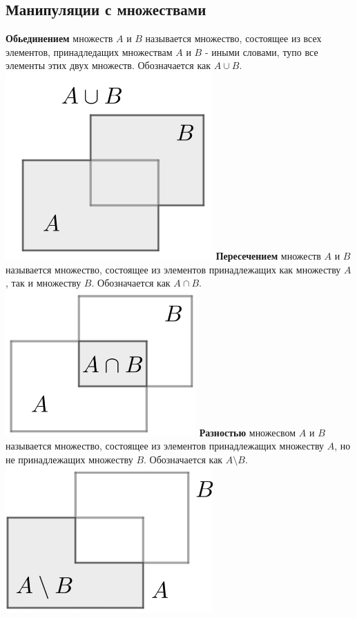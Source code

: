 \documentclass[10pt, a4paper,twocolumn]{article}
\begin{document}
\subsection{Манипуляции с множествами}
\textbf{Обьединением} множеств $A$ и $B$ называется множество, состоящее из всех элементов, принадледащих множествам $A$ и $B$ - иными словами, тупо все элементы этих двух множеств. Обозначается как $A \cup B$.
\\ \includegraphics{cup}
\textbf{Пересечением} множеств $A$ и $B$ называется множество, состоящее из элементов принадлежащих как множеству $A$, так и множеству $B$. Обозначается как $A \cap B$.
\\ \includegraphics{dasuka}
\textbf{Разностью} множесвом $A$ и $B$ называется множество, состоящее из элементов принадлежащих множеству $A$, но не принадлежащих множеству $B$. Обозначается как $A \setminus B$.
\\ \includegraphics{vichet}
\end{document}
